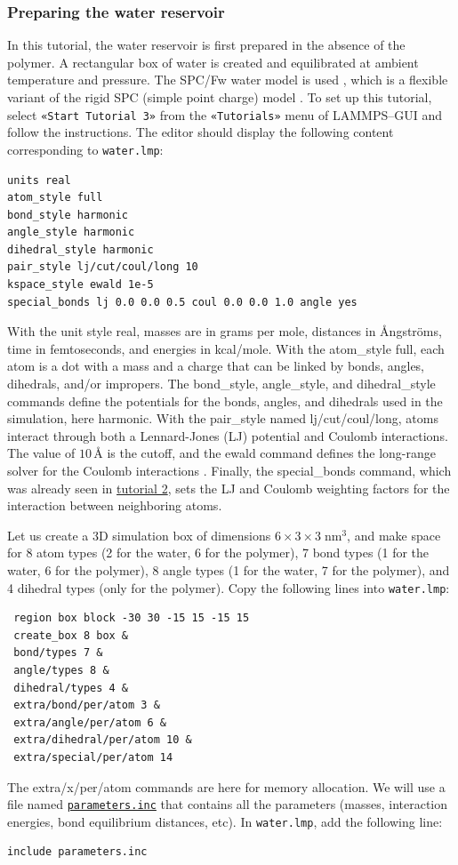 \documentclass[9pt,tutorial]{livecoms}
\newcommand{\lmpcmd}[1]{\hspace{0pt}\colorbox{listing}{\textcolor{command}{\small{#1}}}\hspace{0pt}} %
\newcommand{\flecmd}[1]{\textcolor{command}{\texttt{#1}}} %
\newcommand{\guicmd}[1]{\textcolor{command}{\texttt{«#1»}}} %
\newcommand{\dwlcmd}[1]{\textcolor{download}{\texttt{#1}}} %
\newcommand{\filepath}{https://raw.githubusercontent.com/lammpstutorials/lammpstutorials-article/main/files/}
\begin{document}
\subsubsection{Preparing the water reservoir}

In this tutorial, the water reservoir is first prepared in the absence of the polymer.
A rectangular box of water is created and equilibrated at ambient temperature and
pressure.  The SPC/Fw water model is used \cite{wu2006flexible}, which is
a flexible variant of the rigid SPC (simple point charge) model \cite{berendsen1981interaction}.
To set up this tutorial, select \guicmd{Start Tutorial 3} from the
\guicmd{Tutorials} menu of LAMMPS--GUI and follow the instructions.
The editor should display the following content corresponding to \flecmd{water.lmp}:
\begin{lstlisting}
units real
atom_style full
bond_style harmonic
angle_style harmonic
dihedral_style harmonic
pair_style lj/cut/coul/long 10
kspace_style ewald 1e-5
special_bonds lj 0.0 0.0 0.5 coul 0.0 0.0 1.0 angle yes
\end{lstlisting}
With the unit style \lmpcmd{real}, masses are in grams per mole, distances in
Ångströms, time in femtoseconds, and energies in kcal/mole.  With the \lmpcmd{atom\_style full},
each atom is a dot with a mass and a charge that can be linked by bonds, angles,
dihedrals, and/or impropers.  The \lmpcmd{bond\_style},
\lmpcmd{angle\_style}, and \lmpcmd{dihedral\_style} commands define the potentials
for the bonds, angles, and dihedrals used in the simulation, here \lmpcmd{harmonic}.
With the \lmpcmd{pair\_style} named \lmpcmd{lj/cut/coul/long}, atoms interact through
both a Lennard-Jones (LJ) potential and Coulomb interactions.  The value of $10\,\text{\AA{}}$ is the cutoff,
and the \lmpcmd{ewald} command defines the long-range solver for the Coulomb
interactions \cite{ewald1921berechnung}.  Finally, the \lmpcmd{special\_bonds} command, which was already seen in
\hyperref[carbon-nanotube-label]{tutorial 2}, sets the LJ and Coulomb weighting
factors for the interaction between neighboring atoms.

Let us create a 3D simulation box of dimensions $6 \times 3 \times 3 \; \text{nm}^3$,
and make space for 8 atom types (2 for the water, 6 for the polymer), 7 bond types
(1 for the water, 6 for the polymer), 8 angle types (1 for the water, 7 for the polymer),
and 4 dihedral types (only for the polymer).  Copy the following lines into \flecmd{water.lmp}:
\begin{lstlisting}
 region box block -30 30 -15 15 -15 15
 create_box 8 box &
 bond/types 7 &
 angle/types 8 &
 dihedral/types 4 &
 extra/bond/per/atom 3 &
 extra/angle/per/atom 6 &
 extra/dihedral/per/atom 10 &
 extra/special/per/atom 14
\end{lstlisting}
The \lmpcmd{extra/x/per/atom} commands are here for
memory allocation.  We will use a file named
\href{\filepath tutorial3/parameters.inc}{\dwlcmd{parameters.inc}} that contains
all the parameters (masses, interaction energies, bond equilibrium
distances, etc).  In \flecmd{water.lmp}, add the following line:
\begin{lstlisting}
include parameters.inc
\end{lstlisting}
\end{document}

